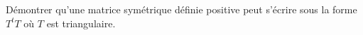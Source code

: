 
\begin{exercice}\label{exoSerieCinq0006}

	Démontrer qu'une matrice symétrique définie positive peut s'écrire sous la forme $T^tT$ où $T$ est triangulaire.

\end{exercice}
